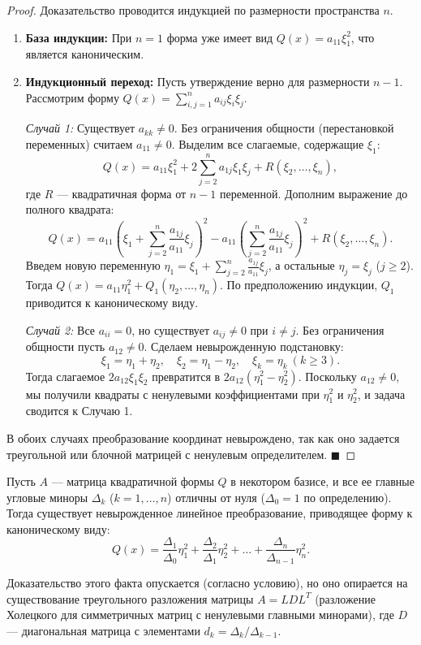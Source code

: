 \begin{proof}
Доказательство проводится индукцией по размерности пространства $n$.
\begin{enumerate}
    \item \textbf{База индукции:} При $n=1$ форма уже имеет вид $Q(x) = a_{11} \xi_1^2$, что является каноническим.
    \item \textbf{Индукционный переход:} Пусть утверждение верно для размерности $n-1$. Рассмотрим форму $Q(x) = \sum_{i,j=1}^n a_{ij} \xi_i \xi_j$.
    
    \textit{Случай 1:} Существует $a_{kk} \neq 0$. Без ограничения общности (перестановкой переменных) считаем $a_{11} \neq 0$. Выделим все слагаемые, содержащие $\xi_1$:
    \[
    Q(x) = a_{11} \xi_1^2 + 2 \sum_{j=2}^n a_{1j} \xi_1 \xi_j + R(\xi_2, \dots, \xi_n),
    \]
    где $R$ --- квадратичная форма от $n-1$ переменной. Дополним выражение до полного квадрата:
    \[
    Q(x) = a_{11} \left( \xi_1 + \sum_{j=2}^n \frac{a_{1j}}{a_{11}} \xi_j \right)^2 - a_{11} \left( \sum_{j=2}^n \frac{a_{1j}}{a_{11}} \xi_j \right)^2 + R(\xi_2, \dots, \xi_n).
    \]
    Введем новую переменную $\eta_1 = \xi_1 + \sum_{j=2}^n \frac{a_{1j}}{a_{11}} \xi_j$, а остальные $\eta_j = \xi_j$ ($j \ge 2$). Тогда $Q(x) = a_{11} \eta_1^2 + Q_1(\eta_2, \dots, \eta_n)$. По предположению индукции, $Q_1$ приводится к каноническому виду.
    
    \textit{Случай 2:} Все $a_{ii} = 0$, но существует $a_{ij} \neq 0$ при $i \neq j$. Без ограничения общности пусть $a_{12} \neq 0$. Сделаем невырожденную подстановку:
    \[
    \xi_1 = \eta_1 + \eta_2, \quad \xi_2 = \eta_1 - \eta_2, \quad \xi_k = \eta_k \ (k \ge 3).
    \]
    Тогда слагаемое $2a_{12} \xi_1 \xi_2$ превратится в $2a_{12} (\eta_1^2 - \eta_2^2)$. Поскольку $a_{12} \neq 0$, мы получили квадраты с ненулевыми коэффициентами при $\eta_1^2$ и $\eta_2^2$, и задача сводится к Случаю 1.
\end{enumerate}
В обоих случаях преобразование координат невырождено, так как оно задается треугольной или блочной матрицей с ненулевым определителем.
\hfill$\blacksquare$
\end{proof}

\begin{theorem}
Пусть $A$ --- матрица квадратичной формы $Q$ в некотором базисе, и все ее главные угловые миноры $\Delta_k$ ($k = 1, \dots, n$) отличны от нуля ($\Delta_0 = 1$ по определению). Тогда существует невырожденное линейное преобразование, приводящее форму к каноническому виду:
\[
Q(x) = \frac{\Delta_1}{\Delta_0} \eta_1^2 + \frac{\Delta_2}{\Delta_1} \eta_2^2 + \dots + \frac{\Delta_n}{\Delta_{n-1}} \eta_n^2.
\]
\end{theorem}

\begin{remark}
Доказательство этого факта опускается (согласно условию), но оно опирается на существование треугольного разложения матрицы $A = L D L^T$ (разложение Холецкого для симметричных матриц с ненулевыми главными минорами), где $D$ --- диагональная матрица с элементами $d_k = \Delta_k / \Delta_{k-1}$.
\end{remark}
